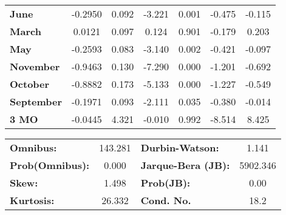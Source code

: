 \begin{center}
\begin{tabular}{lcccccc}
\textbf{June}      &      -0.2950  &        0.092     &    -3.221  &         0.001        &       -0.475    &       -0.115     \\
\textbf{March}     &       0.0121  &        0.097     &     0.124  &         0.901        &       -0.179    &        0.203     \\
\textbf{May}       &      -0.2593  &        0.083     &    -3.140  &         0.002        &       -0.421    &       -0.097     \\
\textbf{November}  &      -0.9463  &        0.130     &    -7.290  &         0.000        &       -1.201    &       -0.692     \\
\textbf{October}   &      -0.8882  &        0.173     &    -5.133  &         0.000        &       -1.227    &       -0.549     \\
\textbf{September} &      -0.1971  &        0.093     &    -2.111  &         0.035        &       -0.380    &       -0.014     \\
\textbf{3 MO}      &      -0.0445  &        4.321     &    -0.010  &         0.992        &       -8.514    &        8.425     \\
\bottomrule
\end{tabular}
\begin{tabular}{lclc}
\textbf{Omnibus:}       & 143.281 & \textbf{  Durbin-Watson:     } &    1.141  \\
\textbf{Prob(Omnibus):} &   0.000 & \textbf{  Jarque-Bera (JB):  } & 5902.346  \\
\textbf{Skew:}          &   1.498 & \textbf{  Prob(JB):          } &     0.00  \\
\textbf{Kurtosis:}      &  26.332 & \textbf{  Cond. No.          } &     18.2  \\
\bottomrule
\end{tabular}
\end{center}


